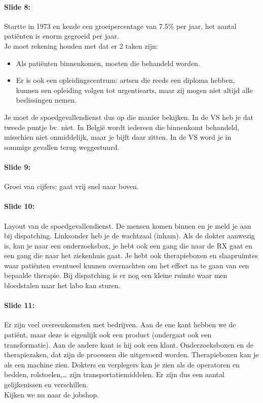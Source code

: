 \documentclass[10pt,a4paper]{report}
\begin{document}
\paragraph{Slide 8:} Startte in 1973 en kende een groeipercentage van 7.5\% per jaar, het aantal pati\"enten is enorm gegroeid per jaar.\\
Je moet rekening houden met dat er 2 taken zijn:
\begin{itemize}
\item Als pati\"enten binnenkomen, moeten die behandeld worden.
\item Er is ook een opleidingscentrum: artsen die reeds een diploma hebben, kunnen een opleiding volgen tot urgentiearts, maar zij mogen niet altijd alle beslissingen nemen. 
\end{itemize}
Je moet de spoedgevallendienst dus op die manier bekijken. In de VS heb je dat tweede puntje bv. niet. In Belgi\"e wordt iedereen die binnenkomt behandeld, misschien niet onmiddelijk, maar je bijft daar zitten. In de VS word je in sommige gevallen terug weggestuurd. 

\paragraph{Slide 9:} Groei van cijfers: gaat vrij snel naar boven.

\paragraph{Slide 10:} Layout van de spoedgevallendienst. De mensen komen binnen en je meld je aan bij dispatching. Linksonder heb je de wachtzaal (inham). Als de dokter aanwezig is, kan je naar een onderzoeksbox, je hebt ook een gang die naar de RX gaat en een gang die naar het ziekenhuis gaat. Je hebt ook therapieboxen en slaapruimtes waar pati\"enten eventueel kunnen overnachten om het effect na te gaan van een bepaalde therapie. Bij dispatching is er nog een kleine ruimte waar men bloedstalen naar het labo kan sturen.

\paragraph{Slide 11:} Er zijn veel overeenkomsten met bedrijven. Aan de ene kant hebben we de pati\"ent, maar deze is eigenlijk ook een product (ondergaat ook een transformatie). Aan de andere kant is hij ook een klant. Onderzoeksboxen en de therapiezaken, dat zijn de processen die uitgevoerd worden. Therapieboxen kan je als een machine zien. Dokters en verplegers kan je zien als de operatoren en bedden, rolstoelen,… zijn transportatiemiddelen. Er zijn dus een aantal gelijkenissen en verschillen.\\
Kijken we nu naar de jobshop.
\end{document}
